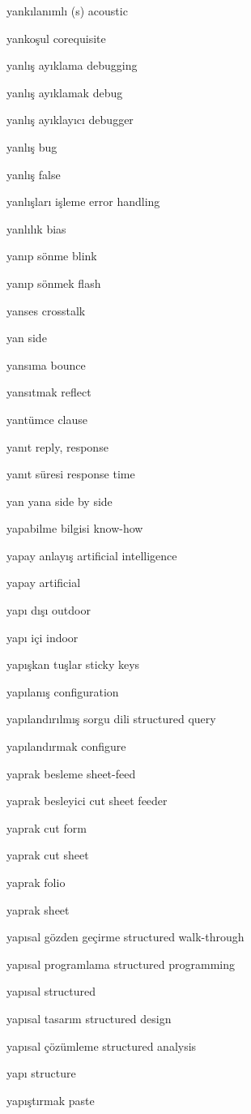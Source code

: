 \documentclass[12pt,fleqn]{article}\usepackage{../../common}
\begin{document}
yankılanımlı (s) acoustic

yankoşul corequisite

yanlış ayıklama debugging

yanlış ayıklamak debug

yanlış ayıklayıcı debugger

yanlış bug

yanlış false

yanlışları işleme error handling

yanlılık bias

yanıp sönme blink

yanıp sönmek flash

yanses crosstalk

yan side

yansıma bounce

yansıtmak reflect

yantümce clause

yanıt reply, response

yanıt süresi response time

yan yana side by side

yapabilme bilgisi know-how

yapay anlayış artificial intelligence

yapay artificial

yapı dışı outdoor

yapı içi indoor

yapışkan tuşlar sticky keys

yapılanış configuration

yapılandırılmış sorgu dili structured query

yapılandırmak configure

yaprak besleme sheet-feed

yaprak besleyici cut sheet feeder

yaprak cut form

yaprak cut sheet

yaprak folio

yaprak sheet

yapısal gözden geçirme structured walk-through

yapısal programlama structured programming

yapısal structured

yapısal tasarım structured design

yapısal çözümleme structured analysis

yapı structure

yapıştırmak paste
\end{document}
